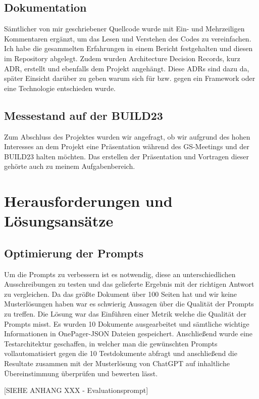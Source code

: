 \subsection{Dokumentation}
Sämtlicher von mir geschriebener Quellcode wurde mit Ein- und Mehrzeiligen Kommentaren ergänzt, um das Lesen und
Verstehen des Codes zu vereinfachen. Ich habe die gesammelten Erfahrungen in einem Bericht festgehalten und diesen im
Repository abgelegt. Zudem wurden Architecture Decision Records, kurz ADR, erstellt und ebenfalls dem Projekt angehängt.
Diese ADRs sind dazu da, später Einsicht darüber zu geben warum sich für bzw. gegen ein Framework oder eine Technologie 
entschieden wurde. 

\subsection{Messestand auf der BUILD23}

Zum Abschluss des Projektes wurden wir angefragt, ob wir 
aufgrund des hohen Interesses an dem Projekt eine Präsentation während des GS-Meetings und der BUILD23 halten möchten. 
Das erstellen der Präsentation und Vortragen dieser gehörte auch zu meinem Aufgabenbereich.


\section{Herausforderungen und Lösungsansätze}

\subsection{Optimierung der Prompts}
Um die Prompts zu verbessern ist es notwendig, diese an unterschiedlichen Ausschreibungen zu testen und das gelieferte 
Ergebnis mit der richtigen Antwort zu vergleichen. Da das größte Dokument über 100 Seiten hat und wir keine Musterlösungen 
haben war es schwierig Aussagen über die Qualität der Prompts zu treffen. Die Lösung war das Einführen einer Metrik welche 
die Qualität der Prompts misst. Es wurden 10 Dokumente ausgearbeitet und sämtliche wichtige Informationen in OnePager-JSON Dateien 
gespeichert. Anschließend wurde eine Testarchitektur geschaffen, in welcher man die gewünschten Prompts vollautomatisiert 
gegen die 10 Testdokumente abfragt und anschließend die Resultate zusammen mit der Musterlösung von ChatGPT auf inhaltliche 
Übereinstimmung überprüfen und bewerten lässt.

[SIEHE ANHANG XXX - Evaluationsprompt]

